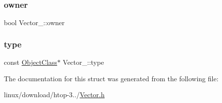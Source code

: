 \mbox{\label{structVector___ac59d1524ee143b9f3cbd3a399a5a1595}} 
\subsubsection{\texorpdfstring{owner}{owner}}
{\footnotesize\ttfamily bool Vector\+\_\+\+::owner}

\mbox{\label{structVector___a221da0f6dd6bf4aa24ce59522fbb69b4}} 
\subsubsection{\texorpdfstring{type}{type}}
{\footnotesize\ttfamily const \hyperlink{Object_8h_a6feb151c3b8f61fae503dfbcdc3d6a54}{Object\+Class}$\ast$ Vector\+\_\+\+::type}



The documentation for this struct was generated from the following file\+:\begin{DoxyCompactItemize}
\item 
linux/download/htop-\/3../\hyperlink{Vector_8h}{Vector.\+h}\end{DoxyCompactItemize}
